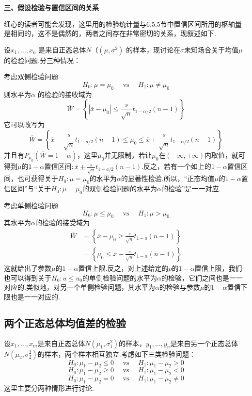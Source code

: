 \textbf{三、假设检验与置信区间的关系}

细心的读者可能会发现，这里用的检验统计量与6.5.5节中置信区间所用的枢轴量是相同的，这不是偶然的，两者之间存在非常密切的关系，现叙述如下.

设$x_{1},\dotsc,x_{n}$ 是来自正态总体$N（(\mu,\sigma^{2})$ 的样本，现讨论在$\sigma$未知场合关于均值$\mu $的检验问题.分三种情况：

考虑双侧检验问题
\[H _ { 0 } : \mu = \mu _ { 0 } \quad \text { vs } \quad H _ { 1 } : \mu \neq \mu _ { 0 }\]
则水平为$\alpha$ 的检验的接收域为
\[
\overline{W}=\left\{\left|\overline{x}-\mu_0\right|\leq\frac{s}{\sqrt{n}}t_{1-\alpha/2}\left(n-1\right)\right\}
\]
它可以改写为
\[
\overline{W}=\left\{\overline{x}-\frac{s}{\sqrt{n}}t_{1-a/2}\left(n-1\right)\le\mu_0\le\overline{x}+\frac{s}{\sqrt{n}}t_{1-\alpha/2}\left(n-1\right)\right\}
\]
并且有$P_{\mu_{ 0 }}(\overline{ W }=1-\alpha)$，这里$\mu_{ 0 }$并无限制，若让$\mu_{ 0 }$在$(-\infty,+\infty)$内取值，就可得到$\mu $的$1-\alpha$置信区间$:\overline { x } \pm \frac { s } { \sqrt { n } } t _ { 1 - a / 2 } ( n - 1 )$.反之，若有一个如上的$1-\alpha$置信区间，也可获得关于$H_{0}:\mu =\mu_{ 0 }$的水平为$\alpha$的显著性检验.所以，“正态均值$\mu$的$1-\alpha$置信区间”与“关于$H_{0}:\mu =\mu_{ 0 }$的双侧检验问题的水平为$\alpha$的检验”是一一对应.

考虑单侧检验问题
\[H _ { 0 } : \mu \leq  \mu _ { 0 } \quad \text { vs } \quad H _ { 1 } : \mu > \mu _ { 0 }\]
其水平为$\alpha$的检验的接受域为
\begin{align*}
\overline { W }& = \left\{ \overline { x } - \mu _ { 0 } \geq \frac { s } { \sqrt { n } } t _ { 1 - a } ( n - 1 ) \right\}\\
&= \left\{ \mu _ { 0 } \leq \overline { x } - \frac { s } { \sqrt { n } } t _ { 1 - \alpha } ( n - 1 ) \right\}
\end{align*}
这就给出了参数$\mu$的$1-\alpha$置信上限.反之，对上述给定的$p$的$1-\alpha$置信上限，我们也可以得到关于$H_{0}:u\leq u_{0}$的单侧检验问题的水平为$\alpha$的检验，它们之间也是一一对应的.类似地，对另一个单侧检验问题，其水平为$\alpha$的检验与参数$\mu$的$1-\alpha$置信下限也是一一对应的.
\subsection{两个正态总体均值差的检验\label{7.2.2}}
设$x_{1},\dotsc,x_{m}$是来自正态总体$N(\mu_{ 1 },\sigma_{1}^{2})$的样本，$y_{1},\dotsc,y_{n}$是来自另一个正态总体$N(\mu_{ 2 },\sigma_{2}^{2})$的样本，两个样本相互独立.考虑如下三类检验问题：
\begin{equation}\label{eq7.2.13}
H _ { 0 } : \mu _ { 1 } - \mu _ { 2 } \leq 0 \quad \text { vs } \quad H _ { 1 } : \mu _ { 1 } - \mu _ { 2 } > 0
\end{equation}
\begin{equation}\label{eq7.2.14}
H _ { 0 } : \mu _ { 1 } - \mu _ { 2 } \geq 0 \quad \text { vs } \quad H _ { 1 } : \mu _ { 1 } - \mu _ { 2 } < 0
\end{equation}
\begin{equation}\label{eq7.2.15}
H _ { 0 } : \mu _ { 1 } - \mu _ { 2 } = 0 \quad \text { vs } \quad H _ { 1 } : \mu _ { 1 } - \mu _ { 2 } \ne  0
\end{equation}
这里主要分两种情形进行讨论.

